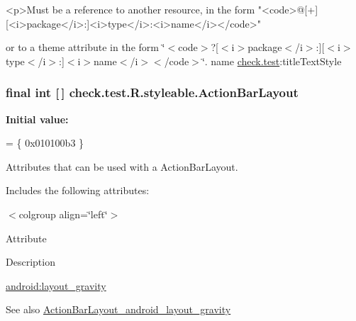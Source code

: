 \begin{DoxyVerb}      <p>Must be a reference to another resource, in the form "<code>@[+][<i>package</i>:]<i>type</i>:<i>name</i></code>"
\end{DoxyVerb}
 or to a theme attribute in the form \char`\"{}$<$code$>$?\mbox{[}$<$i$>$package$<$/i$>$\+:\mbox{]}\mbox{[}$<$i$>$type$<$/i$>$\+:\mbox{]}$<$i$>$name$<$/i$>$$<$/code$>$\char`\"{}.  name \hyperlink{namespacecheck_1_1test}{check.\+test}\+:title\+Text\+Style \hypertarget{classcheck_1_1test_1_1_r_1_1styleable_a8971aa624f5e375a92c516f616a8e96f}{}
\subsubsection[{Action\+Bar\+Layout}]{\setlength{\rightskip}{0pt plus 5cm}final int \mbox{[}$\,$\mbox{]} check.\+test.\+R.\+styleable.\+Action\+Bar\+Layout\hspace{0.3cm}{\ttfamily [static]}}\label{classcheck_1_1test_1_1_r_1_1styleable_a8971aa624f5e375a92c516f616a8e96f}
{\bfseries Initial value\+:}
\begin{DoxyCode}
= \{
            0x010100b3
        \}
\end{DoxyCode}
Attributes that can be used with a Action\+Bar\+Layout. 

Includes the following attributes\+:

\begin{TabularC}{0}
\hline
\end{TabularC}
$<$colgroup align=\char`\"{}left\char`\"{}$>$ 

Attribute

Description 

{\ttfamily \hyperlink{classcheck_1_1test_1_1_r_1_1styleable_a3612dfcddc55dfc324a442784c10f411}{android\+:layout\+\_\+gravity}}

\begin{DoxySeeAlso}{See also}
\hyperlink{classcheck_1_1test_1_1_r_1_1styleable_a3612dfcddc55dfc324a442784c10f411}{Action\+Bar\+Layout\+\_\+android\+\_\+layout\+\_\+gravity} 
\end{DoxySeeAlso}
\hypertarget{classcheck_1_1test_1_1_r_1_1styleable_a3612dfcddc55dfc324a442784c10f411}{}
